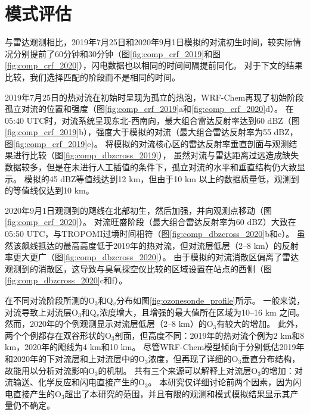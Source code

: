 \section{模式评估}

与雷达观测相比，2019年7月25日和2020年9月1日模拟的对流初生时间，较实际情况分别提前了60分钟和30分钟（图\ref{fig:comp_crf_2019}和图\ref{fig:comp_crf_2020}），闪电数据也以相同的时间间隔提前同化。
对于下文的结果比较，我们选择匹配的阶段而不是相同的时间。

2019年7月25日的热对流在初始时呈现为孤立的热泡，WRF-Chem再现了初始阶段孤立对流的位置和强度（图\ref{fig:comp_crf_2019}a和\ref{fig:comp_crf_2020}d）。
在05:40 UTC时，对流系统呈现东北-西南向，最大组合雷达反射率达到60 dBZ（图\ref{fig:comp_crf_2019}b），强度大于模拟的对流（最大组合雷达反射率为55 dBZ，图\ref{fig:comp_crf_2019}e)。
将模拟的对流核心区的雷达反射率垂直剖面与观测结果进行比较（图\ref{fig:comp_dbzcross_2019}），
虽然对流与雷达距离过远造成缺失数据较多，但是在未进行人工插值的条件下，孤立对流的水平和垂直结构仍大致显示。
模拟的45 dBZ等值线达到12 km，但由于10 km 以上的数据质量低，观测到的等值线仅达到10 km。

2020年9月1日观测到的飑线在北部初生，然后加强，并向观测点移动（图\ref{fig:comp_crf_2020}）。
对流旺盛阶段（最大组合雷达反射率为60 dBZ）大致在05:50 UTC，与TROPOMI过境时间相符（图\ref{fig:comp_dbzcross_2020}b和e）。
虽然该飙线抵达的最高高度低于2019年的热对流，但对流层低层（2--8 km）的反射率更大更广（图\ref{fig:comp_dbzcross_2020}）。
由于模拟的对流消散区偏离了雷达观测到的消散区，这导致与臭氧探空仪比较的区域设置在站点的西侧（图\ref{fig:comp_dbzcross_2020}c和f）。

在不同对流阶段所测的O$_3$和Q$_v$分布如图\ref{fig:ozonesonde_profile}所示。
一般来说，对流导致上对流层O$_3$和Q$_v$浓度增大，且增强的最大值所在区域为10--16 km 之间。
然而，2020年的个例观测显示对流层低层（2--8 km）的O$_3$有较大的增加。
此外，两个个例都存在双谷形状的O$_3$剖面，但高度不同：2019年的热对流个例为2 km和8 km，2020年的飑线为4 km和10 km。
尽管WRF-Chem模型倾向于分别低估2019年和2020年的下对流层和上对流层中的O$_3$浓度，但再现了详细的O$_3$垂直分布结构，故能用以分析对流影响O$_3$的机制。
共有三个来源可以解释上对流层O$_3$的增加：对流输送、化学反应和闪电直接产生的O$_3$。
本研究仅详细讨论前两个因素，因为闪电直接产生的O$_3$超出了本研究的范围，并且有限的观测和模式模拟结果显示其产量仍不确定\citep{Morris.2010,Ripoll.2014}。


